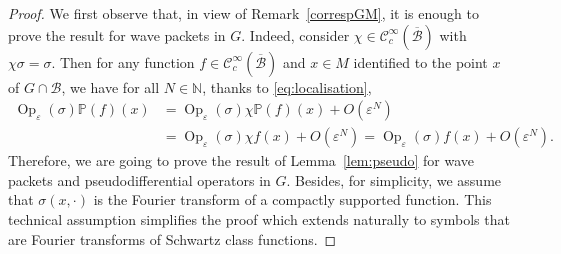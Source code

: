 \documentclass[10pt]{amsart}
\let\mathcal\mathscr
\DeclareMathOperator{\Op}{Op}
\theoremstyle{plain}
\theoremstyle{definition}
\let\eps\varepsilon
\def\N{{\mathbb N}}
\def\bbP{{\mathbb P}}
\begin{document}
\begin{proof}
We first observe that, in view of Remark~\ref{correspGM}, it is enough to prove the result for wave packets in $G$. Indeed, consider $\chi\in\mathcal C^\infty_c(\overline{\mathcal B})$ with $\chi\sigma=\sigma$. Then for any function $f\in \mathcal C^\infty_c(\overline{\mathcal B})$ and $x\in M$ identified to the point $x$ of $G\cap \mathcal B$, we have for all $N\in\N$, thanks to \eqref{eq:localisation},
\begin{align*}
\Op_\eps(\sigma) \bbP (f) (x) & = \Op_\eps (\sigma) \chi \bbP(f) (x) +O(\eps ^N)\\
&= \Op_\eps (\sigma) \chi f (x) +O(\eps ^N)= \Op_\eps(\sigma) f(x) +O(\eps^N).
\end{align*}
Therefore, we are going to prove the result of Lemma~\ref{lem:pseudo} for wave packets and pseudodifferential operators in $G$.
Besides,
for simplicity, we assume that $\sigma(x,\cdot)$ is the Fourier transform of a compactly supported function. This technical assumption simplifies the proof which extends naturally to symbols that are Fourier transforms of Schwartz class functions.


\end{proof}
\end{document}
